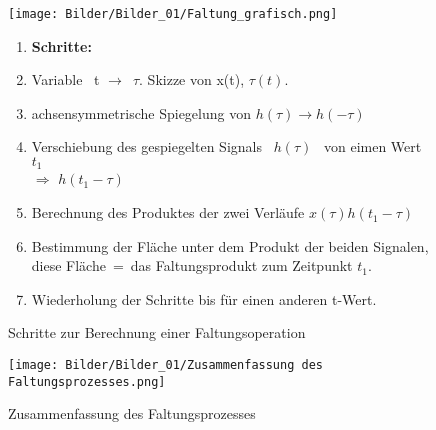 \begin{figure}[H]
    \centering
    \begin{minipage}{.45\textwidth}
        \texttt{[image: Bilder/Bilder\_01/Faltung\_grafisch.png]}
    \end{minipage}
    \begin{minipage}{.45\textwidth}
        \begin{enumerate}
            \item[]
            \textbf{Schritte:}\\
            \item 
            Variable $\,$ t $\rightarrow$\ $\tau$. Skizze von x(t), $\tau(t)$.
            \item
            achsensymmetrische Spiegelung von $h(\tau) \rightarrow h(-\tau)$
            \item
            Verschiebung des gespiegelten Signals $\,$ $h(\tau)$ $\,$ von eimen Wert $t_1$\\
            $\Rightarrow$ $h(t_1-\tau)$
            \item
            Berechnung des Produktes der zwei Verläufe $x(\tau)h(t_1-\tau)$
            \item
            Bestimmung der Fläche unter dem Produkt der beiden Signalen, diese Fläche $\,$=$\,$ das Faltungsprodukt zum Zeitpunkt $t_1$.
            \item
            Wiederholung der Schritte  bis  für einen anderen t-Wert.
        \end{enumerate}
    \end{minipage}
    \caption{Schritte zur Berechnung einer Faltungsoperation}
\end{figure}

\begin{figure}[H]
    \centering
    \texttt{[image: Bilder/Bilder\_01/Zusammenfassung des Faltungsprozesses.png]}
    \caption{Zusammenfassung des Faltungsprozesses}
    \label{fig:Zusammenfassung Faltung}
\end{figure}

\newpage